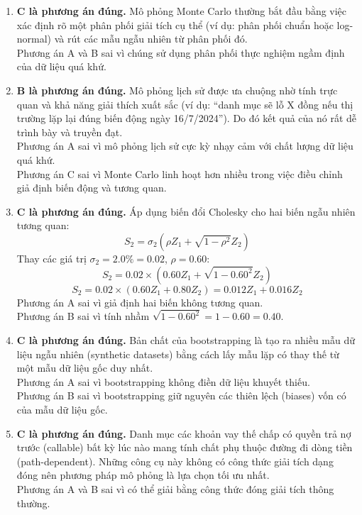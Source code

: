 \begin{enumerate}
	\item \textbf{C là phương án đúng.} Mô phỏng Monte Carlo thường bắt đầu bằng việc xác định rõ một phân phối giải tích cụ thể (ví dụ: phân phối chuẩn hoặc log-normal) và rút các mẫu ngẫu nhiên từ phân phối đó. \\
	Phương án A và B sai vì chúng sử dụng phân phối thực nghiệm ngầm định của dữ liệu quá khứ.
	
	\item \textbf{B là phương án đúng.} Mô phỏng lịch sử được ưa chuộng nhờ tính trực quan và khả năng giải thích xuất sắc (ví dụ: ``danh mục sẽ lỗ X đồng nếu thị trường lặp lại đúng biến động ngày 16/7/2024''). Do đó kết quả của nó rất dễ trình bày và truyền đạt. \\
	Phương án A sai vì mô phỏng lịch sử cực kỳ nhạy cảm với chất lượng dữ liệu quá khứ. \\
	Phương án C sai vì Monte Carlo linh hoạt hơn nhiều trong việc điều chỉnh giả định biến động và tương quan.
	
	\item \textbf{C là phương án đúng.} Áp dụng biến đổi Cholesky cho hai biến ngẫu nhiên tương quan:
	      \[
	      S_2 = \sigma_2 \left(\rho Z_1 + \sqrt{1 - \rho^2} Z_2\right)
	      \]
	      Thay các giá trị $\sigma_2 = 2.0\% = 0.02$, $\rho = 0.60$:
	      \[
	      S_2 = 0.02 \times \left(0.60 Z_1 + \sqrt{1 - 0.60^2} Z_2\right)
	      \]
	      \[
	      S_2 = 0.02 \times (0.60 Z_1 + 0.80 Z_2) = 0.012 Z_1 + 0.016 Z_2
	      \]
	      Phương án A sai vì giả định hai biến không tương quan. \\
	      Phương án B sai vì tính nhầm $\sqrt{1 - 0.60^2} = 1 - 0.60 = 0.40$.
	      
	\item \textbf{C là phương án đúng.} Bản chất của bootstrapping là tạo ra nhiều mẫu dữ liệu ngẫu nhiên (synthetic datasets) bằng cách lấy mẫu lặp có thay thế từ một mẫu dữ liệu gốc duy nhất. \\
	Phương án A sai vì bootstrapping không điền dữ liệu khuyết thiếu. \\
	Phương án B sai vì bootstrapping giữ nguyên các thiên lệch (biases) vốn có của mẫu dữ liệu gốc.
	
	\item \textbf{C là phương án đúng.} Danh mục các khoản vay thế chấp có quyền trả nợ trước (callable) bất kỳ lúc nào mang tính chất phụ thuộc đường đi dòng tiền (path-dependent). Những công cụ này không có công thức giải tích dạng đóng nên phương pháp mô phỏng là lựa chọn tối ưu nhất. \\
	Phương án A và B sai vì có thể giải bằng công thức đóng giải tích thông thường.
	

\end{enumerate}

